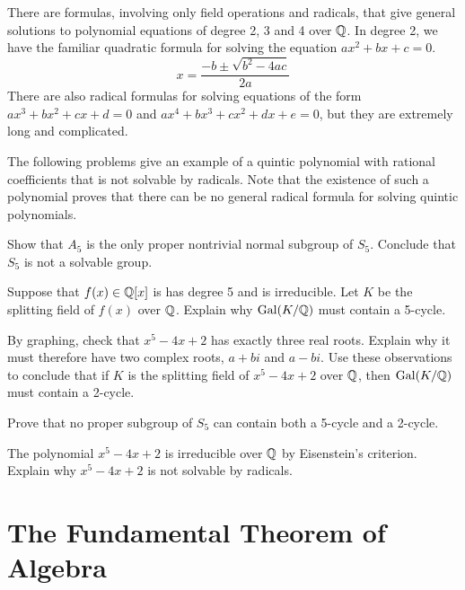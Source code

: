 There are formulas, involving only field operations and radicals, that give general solutions to polynomial equations of degree 2, 3 and 4 over $\mathbb{Q}$. In degree 2, we have the familiar quadratic formula for solving the equation $ax^2+bx+c=0$.
$$x=\frac{-b\pm\sqrt{b^2-4ac}}{2a}$$
There are also radical formulas for solving equations of the form $ax^3+bx^2+cx+d=0$ and  $ax^4+bx^3+cx^2+dx+e=0$, but they are extremely long and complicated.
\medskip

The following problems give an example of a quintic polynomial with rational coefficients that is not solvable by radicals. Note that the existence of such a polynomial proves that there can be no general radical formula for solving quintic polynomials.

\begin{problem}
    Show that $A_5$ is the only proper nontrivial normal subgroup of $S_5$. Conclude that $S_5$ is not a solvable group.
\end{problem}



\begin{problem}
    Suppose that $f(x) \in \mathbb{Q}[x]$ is has degree 5 and is irreducible.
    Let $K$ be the splitting field of $f(x)$ over $\mathbb{Q}$. Explain why $\operatorname{Gal}(K/\mathbb{Q})$ must contain a 5-cycle.
\end{problem}



\begin{problem}
    By graphing, check that $x^5-4x+2$ has exactly three real roots. Explain why it must therefore have two complex roots, $a+bi$ and $a-bi$. Use these observations to conclude that if $K$ is the splitting field of $x^5-4x+2$ over $\mathbb{Q}$, then $\operatorname{Gal}(K/\mathbb{Q})$ must contain a 2-cycle.
\end{problem}



\begin{problem}
    Prove that no proper subgroup of $S_5$ can contain both a 5-cycle and a 2-cycle.
\end{problem}



\begin{problem}
The polynomial $x^5-4x+2$ is irreducible over $\mathbb{Q}$ by Eisenstein's criterion. Explain why $x^5-4x+2$ is not solvable by radicals.
\end{problem}


\section{The Fundamental Theorem of Algebra}


